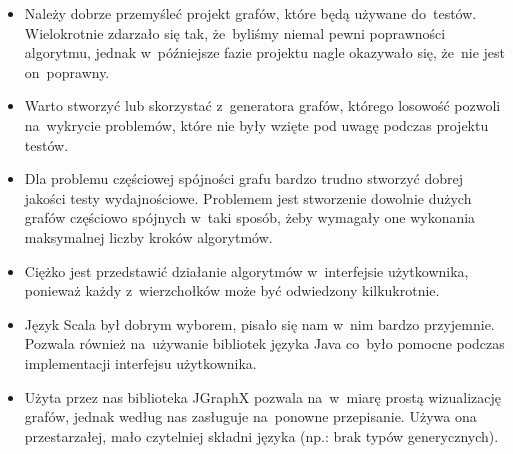 \documentclass[a4paper,12pt]{mwart}
\begin{document}
\begin{itemize}
\item Należy dobrze przemyśleć projekt grafów, które będą używane do~testów.
  Wielokrotnie zdarzało się tak, że~byliśmy niemal pewni poprawności algorytmu,
  jednak w~późniejsze fazie projektu nagle okazywało się, że~nie jest
  on~poprawny.
\item Warto stworzyć lub skorzystać z~generatora grafów, którego losowość
  pozwoli na~wykrycie problemów, które nie były wzięte pod uwagę podczas
  projektu testów.
\item Dla problemu częściowej spójności grafu bardzo trudno stworzyć dobrej
  jakości testy wydajnościowe. Problemem jest stworzenie dowolnie dużych grafów
  częściowo spójnych w~taki sposób, żeby wymagały one wykonania maksymalnej
  liczby kroków algorytmów.
\item Ciężko jest przedstawić działanie algorytmów w~interfejsie użytkownika,
  ponieważ każdy z~wierzchołków może być odwiedzony kilkukrotnie.
\item Język Scala był dobrym wyborem, pisało się nam w~nim bardzo przyjemnie.
  Pozwala również na~używanie bibliotek języka Java co~było pomocne podczas
  implementacji interfejsu użytkownika.
\item Użyta przez nas biblioteka JGraphX pozwala na~w~miarę prostą wizualizację
  grafów, jednak według nas zasługuje na~ponowne przepisanie. Używa ona
  przestarzałej, mało czytelniej składni języka (np.: brak typów generycznych).
\end{itemize}
\end{document}
